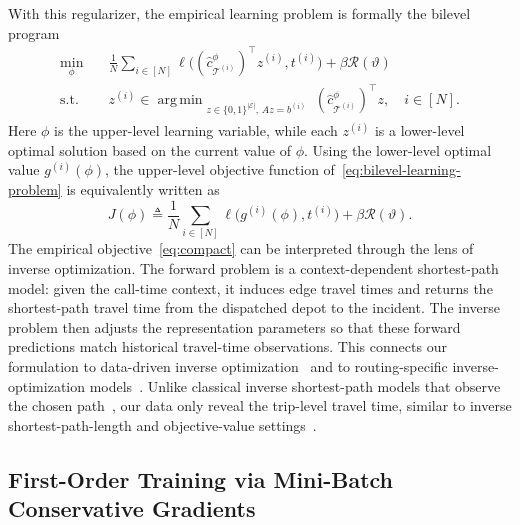 \documentclass[11pt, letterpaper, oneside, reqno]{amsart}
\DeclareMathOperator*{\argmin}{arg\,min}
\newcommand{\Let}{\triangleq}
\begin{document}
With this regularizer, the empirical learning problem is formally the bilevel program
\begin{equation}
\label{eq:bilevel-learning-problem}
\begin{aligned}
\min_{\phi} \quad
& \frac{1}{N}\sum_{i\in[N]} \ell\bigl((\hat c_{\mathcal T^{(i)}}^\phi)^\top z^{(i)}, t^{(i)}\bigr) + \beta \mathcal R(\vartheta) \\
\text{s.t.}\quad
& z^{(i)} \in \argmin_{\substack{z \in \{0,1\}^{|\mathcal E|},\, A z = b^{(i)}}} (\hat c_{\mathcal T^{(i)}}^\phi)^\top z, \quad i\in[N].
\end{aligned}
\end{equation}
Here $\phi$ is the upper-level learning variable, while each $z^{(i)}$ is a lower-level optimal solution based on the current value of $\phi$. Using the lower-level optimal value $g^{(i)}(\phi)$, the upper-level objective function of~\eqref{eq:bilevel-learning-problem} is equivalently written as
\begin{equation}
J(\phi) \Let \frac{1}{N} \sum_{i \in [N]} \ell\bigl(g^{(i)}(\phi), t^{(i)}\bigr) + \beta \mathcal R(\vartheta).
\label{eq:compact}
\end{equation}
The empirical objective~\eqref{eq:compact} can be interpreted through the lens of inverse optimization. The forward problem is a context-dependent shortest-path model: given the call-time context, it induces edge travel times and returns the shortest-path travel time from the dispatched depot to the incident. The inverse problem then adjusts the representation parameters so that these forward predictions match historical travel-time observations. This connects our formulation to data-driven inverse optimization~\cite{ref:mohajerin2018inverse, ref:chan2025inverse} and to routing-specific inverse-optimization models~\cite{ref:zattoni2025inverse}. Unlike classical inverse shortest-path models that observe the chosen path~\cite{ref:burton1992instance}, our data only reveal the trip-level travel time, similar to inverse shortest-path-length and objective-value settings~\cite{ref:cui2010complexity}.

\subsection{First-Order Training via Mini-Batch Conservative Gradients} \label{sec:conservative-training}
\end{document}
